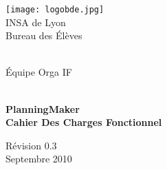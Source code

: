\begin{titlepage}



\begin{minipage}{0.3\textwidth}
\centering
\texttt{[image: logobde.jpg]}
\\
INSA de Lyon \\
Bureau des Élèves \\

\end{minipage}
\hfill
\begin{minipage}{0.3\textwidth}
\centering
 
~
\\[3cm]

Équipe Orga IF
\end{minipage}


\begin{center} 
\hrulefill \\[0.4cm]
{ \Huge \bfseries PlanningMaker}\\ {  \bfseries Cahier Des Charges Fonctionnel} \\[0.4cm]
 \hrulefill






\vfill {\Large Révision 0.3} \\[2cm]
{ Septembre 2010  } \\





\end{center}


\end{titlepage}

